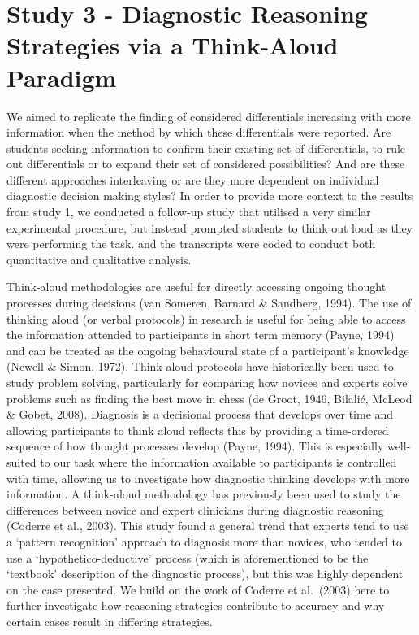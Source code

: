 \documentclass[a4paper, nobind]{templates/ociamthesis}
\begin{document}
\hypertarget{study-3---diagnostic-reasoning-strategies-via-a-think-aloud-paradigm}{%
\chapter*{Study 3 - Diagnostic Reasoning Strategies via a Think-Aloud Paradigm}\label{study-3---diagnostic-reasoning-strategies-via-a-think-aloud-paradigm}}

\adjustmtc
{}

We aimed to replicate the finding of considered differentials increasing with more information when the method by which these differentials were reported. Are students seeking information to confirm their existing set of differentials, to rule out differentials or to expand their set of considered possibilities? And are these different approaches interleaving or are they more dependent on individual diagnostic decision making styles? In order to provide more context to the results from study 1, we conducted a follow-up study that utilised a very similar experimental procedure, but instead prompted students to think out loud as they were performing the task. and the transcripts were coded to conduct both quantitative and qualitative analysis.

Think-aloud methodologies are useful for directly accessing ongoing thought processes during decisions (van Someren, Barnard \& Sandberg, 1994). The use of thinking aloud (or verbal protocols) in research is useful for being able to access the information attended to participants in short term memory (Payne, 1994) and can be treated as the ongoing behavioural state of a participant's knowledge (Newell \& Simon, 1972). Think-aloud protocols have historically been used to study problem solving, particularly for comparing how novices and experts solve problems such as finding the best move in chess (de Groot, 1946, Bilalić, McLeod \& Gobet, 2008). Diagnosis is a decisional process that develops over time and allowing participants to think aloud reflects this by providing a time-ordered sequence of how thought processes develop (Payne, 1994). This is especially well-suited to our task where the information available to participants is controlled with time, allowing us to investigate how diagnostic thinking develops with more information. A think-aloud methodology has previously been used to study the differences between novice and expert clinicians during diagnostic reasoning (Coderre et al., 2003). This study found a general trend that experts tend to use a `pattern recognition' approach to diagnosis more than novices, who tended to use a `hypothetico-deductive' process (which is aforementioned to be the `textbook' description of the diagnostic process), but this was highly dependent on the case presented. We build on the work of Coderre et al.~(2003) here to further investigate how reasoning strategies contribute to accuracy and why certain cases result in differing strategies.
\end{document}
